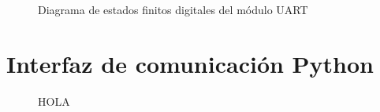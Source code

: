 		\begin{figure}[h]
		\centering
			\caption{Diagrama de estados finitos digitales del módulo UART}
			\label{fig:FSMD_UART}
		\end{figure}

\section{Interfaz de comunicación Python}

		\begin{figure}[h]
		\centering
			\caption{HOLA}
			\label{fig:hola}
		\end{figure}
